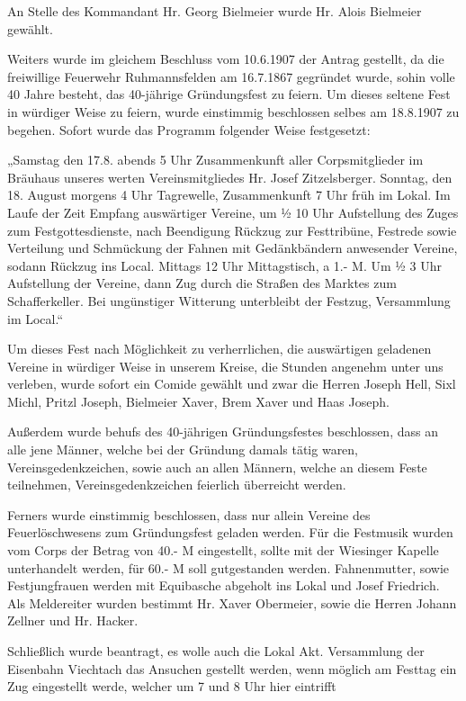 \documentclass[12pt,a4pager]{book}
\begin{document}
An Stelle des Kommandant Hr. Georg Bielmeier wurde Hr. Alois Bielmeier gewählt.

Weiters wurde im gleichem Beschluss vom 10.6.1907 der Antrag gestellt, da die
freiwillige Feuerwehr Ruhmannsfelden am 16.7.1867 gegründet wurde, sohin volle
40 Jahre besteht, das 40-jährige Gründungsfest zu feiern. Um dieses seltene Fest
in würdiger Weise zu feiern, wurde einstimmig beschlossen selbes am 18.8.1907 zu
begehen. Sofort wurde das Programm folgender Weise festgesetzt:

„Samstag den 17.8. abends 5 Uhr Zusammenkunft aller Corpsmitglieder im Bräuhaus
unseres werten Vereinsmitgliedes Hr. Josef Zitzelsberger. Sonntag, den 18.
August morgens 4 Uhr Tagrewelle, Zusammenkunft 7 Uhr früh im Lokal. Im Laufe der
Zeit Empfang auswärtiger Vereine, um ½ 10 Uhr Aufstellung des Zuges zum
Festgottesdienste, nach Beendigung Rückzug zur Festtribüne, Festrede sowie
Verteilung und Schmückung der Fahnen mit Gedänkbändern anwesender Vereine,
sodann Rückzug ins Local. Mittags 12 Uhr Mittagstisch, a 1.- M. Um ½ 3 Uhr
Aufstellung der Vereine, dann Zug durch die Straßen des Marktes zum
Schafferkeller. Bei ungünstiger Witterung unterbleibt der Festzug, Versammlung
im Local.“

Um dieses Fest nach Möglichkeit zu verherrlichen, die auswärtigen geladenen
Vereine in würdiger Weise in unserem Kreise, die Stunden angenehm unter uns
verleben, wurde sofort ein Comide gewählt und zwar die Herren Joseph Hell, Sixl
Michl, Pritzl Joseph, Bielmeier Xaver, Brem Xaver und Haas Joseph.

Außerdem wurde behufs des 40-jährigen Gründungsfestes beschlossen, dass an alle
jene Männer, welche bei der Gründung damals tätig waren, Vereinsgedenkzeichen,
sowie auch an allen Männern, welche an diesem Feste teilnehmen,
Vereinsgedenkzeichen feierlich überreicht werden.

Ferners wurde einstimmig beschlossen, dass nur allein Vereine des
Feuerlöschwesens zum Gründungsfest geladen werden. Für die Festmusik wurden vom
Corps der Betrag von 40.- M eingestellt, sollte mit der Wiesinger Kapelle
unterhandelt werden, für 60.- M soll gutgestanden werden. Fahnenmutter, sowie
Festjungfrauen werden mit Equibasche abgeholt ins Lokal und Josef Friedrich. Als
Meldereiter wurden bestimmt Hr. Xaver Obermeier, sowie die Herren Johann Zellner
und Hr. Hacker.

Schließlich wurde beantragt, es wolle auch die Lokal Akt. Versammlung der
Eisenbahn Viechtach das Ansuchen gestellt werden, wenn möglich am Festtag ein
Zug eingestellt werde, welcher um 7 und 8 Uhr hier eintrifft
\end{document}
